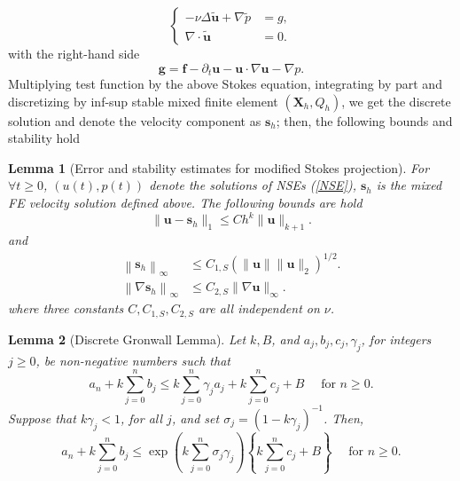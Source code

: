 \documentclass[10pt,twoside,openany,UTF8,CJK]{article}
\newtheorem{Lemma}{Lemma}[section]
\begin{document}
	$$
	\left\{
	\begin{aligned}
		-\nu\Delta \boldsymbol{\tilde{u}} + \nabla \tilde{p} &= g, \\
		\nabla\cdot \boldsymbol{\tilde{u}} &= 0.
	\end{aligned}\right.
	$$
	with the right-hand side 
	$$
	\boldsymbol{g} = \boldsymbol{f} - \partial_t \boldsymbol{u} - \boldsymbol{u}\cdot\nabla\boldsymbol{u} - \nabla p.
	$$
	\indent Multiplying test function by the above Stokes equation, integrating by part and discretizing by inf-sup stable mixed finite element $(\boldsymbol{X}_h,Q_h)$, we get the discrete solution and denote the velocity component as $\boldsymbol{s}_h$; then, the following bounds and stability hold
	\begin{Lemma}[Error and stability estimates for modified Stokes projection\cite{POD-LPS-SINUM-2021}]
		For $\forall t \geq 0$, $(u(t),p(t))$ denote the solutions of NSEs (\ref{NSE}), $\boldsymbol{s}_h$ is the mixed FE velocity solution defined above. The following bounds are hold
		$$
		\| \boldsymbol{u} - \boldsymbol{s}_h \|_1 \leq Ch^k\|\boldsymbol{u}\|_{k+1}.
		$$
		and 
		$$
		\begin{aligned}
			\left\|\boldsymbol{s}_h\right\|_{\infty} & \leq C_{1,S}(\|\boldsymbol{u}\|\|\boldsymbol{u}\|_2)^{1/2}. \\
			\left\|\nabla \boldsymbol{s}_h\right\|_{\infty} & \leq C_{2,S}\|\nabla \boldsymbol{u}\|_{\infty}.
		\end{aligned}
	    $$
	    where three constants $C,C_{1,S},C_{2,S}$ are all independent on $\nu$.
	\end{Lemma}

    \begin{Lemma}[Discrete Gronwall Lemma\cite{Heywood-Rannacher-1982-SINUM-4}]\label{Gronwall}
    	Let $k, B$, and $a_j, b_j, c_j, \gamma_j$, for integers $j \geq 0$, be non-negative numbers such that
    $$
    a_n+k \sum_{j=0}^n b_j \leq k \sum_{j=0}^n \gamma_j a_j+k \sum_{j=0}^n c_j+B \quad \text { for } n \geq 0 .
    $$
    Suppose that $k \gamma_j<1$, for all $j$, and set $\sigma_j = \left(1-k \gamma_j\right)^{-1}$. Then,
    $$
    a_n+k \sum_{j=0}^n b_j \leq \exp \left(k \sum_{j=0}^n \sigma_j \gamma_j\right)\left\{k \sum_{j=0}^n c_j+B\right\} \quad \text { for } n \geq 0.
    $$
    \end{Lemma}
\end{document}
